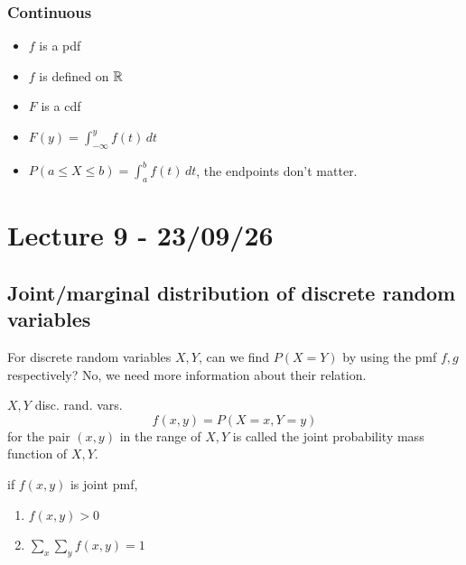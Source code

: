 \documentclass[11pt]{article}
\begin{document}
\subsubsection{Continuous}
\begin{itemize}
    \item $f$ is a pdf
    \item $f$ is defined on $\mathbb{R}$
    \item $F$ is a cdf
    \item $F(y) = \int_{-\infty}^{y} f(t)\, dt$
    \item $P(a \le X \le b) = \int_{a}^{b} f(t) \, dt$, the endpoints don't matter.
\end{itemize}

\section{Lecture 9 - 23/09/26}
\subsection{Joint/marginal distribution of discrete random variables}
For discrete random variables $X, Y$, can we find $P(X=Y)$ by using the pmf $f,g$ respectively? 
No, we need more information about their relation.
\begin{definition}
    $X, Y$ disc. rand. vars. 
    \[
        f(x, y) = P(X=x, Y=y)
    \]
    for the pair $(x,y)$ in the range of $X, Y$ is called the joint probability mass function of $X,Y$.
\end{definition}
\begin{theorem}
    if $f(x,y)$ is joint pmf,
    \begin{enumerate}
        \item $f(x,y) > 0$
        \item $\sum_{x} \sum_{y} f(x,y) = 1$
    \end{enumerate}
\end{theorem}
\end{document}
